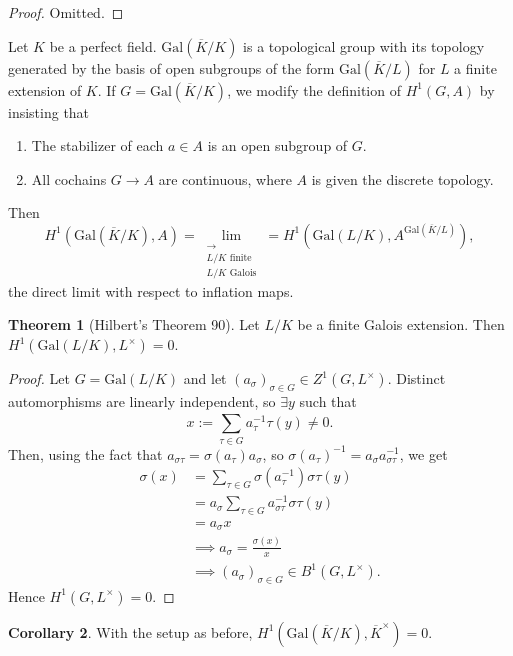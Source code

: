 \documentclass{article}
\theoremstyle{definition}
\newtheorem{theorem}{Theorem}[section]
\newtheorem{cor}[theorem]{Corollary}
\begin{document}
\begin{proof}
    Omitted.
\end{proof}
Let $K$ be a perfect field. $\text{Gal}(\overline{K}/K)$ is a topological group with its topology generated by the basis of open subgroups of the form $\text{Gal}(\overline{K}/L)$ for $L$ a finite extension of $K$. If $G = \text{Gal}(\overline{K}/K)$, we modify the definition of $H^1(G,A)$ by insisting that
\begin{enumerate}[(1)]
    \item The stabilizer of each $a \in A$ is an open subgroup of $G$.
    \item All cochains $G \to A$ are continuous, where $A$ is given the discrete topology.
\end{enumerate}
Then $$H^1(\text{Gal}(\overline{K}/K),A) = \lim_{\substack{\longrightarrow\\L/K \text{ finite}\\L/K \text{ Galois}}} = H^1(\text{Gal}(L/K),A^{\text{Gal}(\overline{K}/L)}),$$ the direct limit with respect to inflation maps.
\begin{theorem}[Hilbert's Theorem 90]\label{theorem15.3}
    Let $L/K$ be a finite Galois extension. Then $H^1(\text{Gal}(L/K),L^\times)=0$.
\end{theorem}
\begin{proof}
    Let $G = \text{Gal}(L/K)$ and let $(a_\sigma)_{\sigma \in G} \in Z^1(G,L^\times)$. Distinct automorphisms are linearly independent, so $\exists y$ such that \[
    x := \sum_{\tau \in G}^{} a_{\tau}^{-1} \tau(y) \neq 0.
    \]
    Then, using the fact that $a_{\sigma \tau}=\sigma(a_\tau)a_\sigma$, so $\sigma(a_\tau)^{-1} = a_\sigma a_{\sigma \tau}^{-1}$, we get
    \begin{align*}
        \sigma(x) &= \sum_{\tau \in G}^{} \sigma(a_{\tau}^{-1})\sigma \tau(y) \\
        &= a_\sigma \sum_{\tau \in G}^{} a_{\sigma \tau}^{-1} \sigma \tau(y) \\
        &= a_\sigma x \\
        &\implies  a_\sigma = \frac{\sigma(x)}{x} \\
        &\implies (a_\sigma)_{\sigma \in G} \in B^1(G,L^\times).
    \end{align*}
    Hence $H^1(G,L^\times) = 0$.
\end{proof}
\begin{cor}
    With the setup as before, $H^1(\text{Gal}(\overline{K}/K),\overline{K}^\times) = 0$.
\end{cor}
\end{document}
